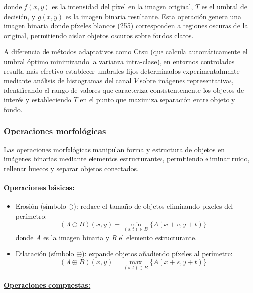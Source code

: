 donde $f(x,y)$ es la intensidad del píxel en la imagen original, $T$ es el umbral de decisión, y $g(x,y)$ es la imagen binaria resultante. Esta operación genera una imagen binaria donde píxeles blancos (255) corresponden a regiones oscuras de la original, permitiendo aislar objetos oscuros sobre fondos claros.

A diferencia de métodos adaptativos como Otsu (que calcula automáticamente el umbral óptimo minimizando la varianza intra-clase), en entornos controlados resulta más efectivo establecer umbrales fijos determinados experimentalmente mediante análisis de histogramas del canal $V$ sobre imágenes representativas, identificando el rango de valores que caracteriza consistentemente los objetos de interés y estableciendo $T$ en el punto que maximiza separación entre objeto y fondo.

\subsubsection{Operaciones morfológicas}

Las operaciones morfológicas manipulan forma y estructura de objetos en imágenes binarias mediante elementos estructurantes, permitiendo eliminar ruido, rellenar huecos y separar objetos conectados.

\paragraph{\underline{Operaciones básicas:}}

\begin{itemize}[label=$\bullet$]
\item Erosión (símbolo $\ominus$): reduce el tamaño de objetos eliminando píxeles del perímetro:
\begin{equation}
(A \ominus B)(x,y) = \min_{(s,t) \in B} \{A(x+s, y+t)\}
\end{equation}
donde $A$ es la imagen binaria y $B$ el elemento estructurante.

\item Dilatación (símbolo $\oplus$): expande objetos añadiendo píxeles al perímetro:
\begin{equation}
(A \oplus B)(x,y) = \max_{(s,t) \in B} \{A(x+s, y+t)\}
\end{equation}
\end{itemize}

\paragraph{\underline{Operaciones compuestas:}}

